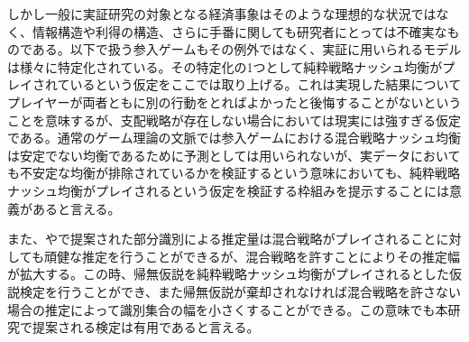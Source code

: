 しかし一般に実証研究の対象となる経済事象はそのような理想的な状況ではなく、情報構造や利得の構造、さらに手番に関しても研究者にとっては不確実なものである。以下で扱う参入ゲームもその例外ではなく、実証に用いられるモデルは様々に特定化されている。その特定化の1つとして純粋戦略ナッシュ均衡がプレイされているという仮定をここでは取り上げる。これは実現した結果についてプレイヤーが両者ともに別の行動をとればよかったと後悔することがないということを意味するが、支配戦略が存在しない場合においては現実には強すぎる仮定である。通常のゲーム理論の文脈では参入ゲームにおける混合戦略ナッシュ均衡は安定でない均衡であるために予測としては用いられないが、実データにおいても不安定な均衡が排除されているかを検証するという意味においても、純粋戦略ナッシュ均衡がプレイされるという仮定を検証する枠組みを提示することには意義があると言える。

また、\cite{Tamer2003a}や\cite{Ciliberto2009a}で提案された部分識別による推定量は混合戦略がプレイされることに対しても頑健な推定を行うことができるが、混合戦略を許すことによりその推定幅が拡大する。この時、帰無仮説を純粋戦略ナッシュ均衡がプレイされるとした仮説検定を行うことができ、また帰無仮説が棄却されなければ混合戦略を許さない場合の推定によって識別集合の幅を小さくすることができる。この意味でも本研究で提案される検定は有用であると言える。

